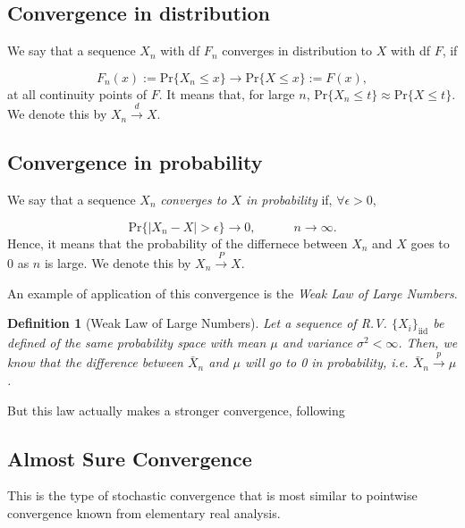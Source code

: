 \documentclass[11pt,a4paper,openany ]{book}
\newtheorem{definition}{Definition}[chapter]
\begin{document}
\subsection*{Convergence in distribution}

We say that a sequence $X_n$ with df $F_n$ converges in distribution to $X$ with df $F$, if 

\begin{equation}
F_n(x):=\text{Pr}\big\{X_n\leq x\big\}\longrightarrow \text{Pr}\{X\leq x\}:=F(x),
\end{equation}
at all continuity points of $F$. It means that, for large $n$, $\text{Pr}\{X_n\leq t\}\approx\text{Pr}\{X\leq t\}$.
We denote this by $X_n\stackrel{d}{\to}X$.


\subsection*{Convergence in probability}

We say that a sequence $X_n$ \emph{converges to $X$ in probability} if, $\forall\epsilon>0$, 

\begin{equation}
\text{Pr}\Big\{|X_n-X|>\epsilon\Big\}\to 0, \qquad\quad n\to\infty.
\end{equation}
Hence, it means that the probability of the differnece between $X_n$ and $X$ goes to 0 as $n$ is large.  We denote this by $X_n\stackrel{P}{\rightarrow}X$.

An example of application of this convergence is the \emph{Weak Law of Large Numbers}. 

\begin{definition}[Weak Law of Large Numbers]
Let a sequence of R.V. $\{X_i\}_{\text{iid}}$ be defined of the same probability space with mean $\mu$ and variance $\sigma^2<\infty$. Then, we know that the difference between $\bar{X}_n$  and $\mu$ will go to 0 in probability, i.e. $\bar{X}_n\stackrel{p}{\to}\mu$.
\end{definition}

But this law actually makes a stronger convergence, following \citet{kolmogorov_foundations_1956}

\subsection*{Almost Sure Convergence} 

This is the type of stochastic convergence that is most similar to pointwise convergence known from elementary real analysis.
\end{document}
